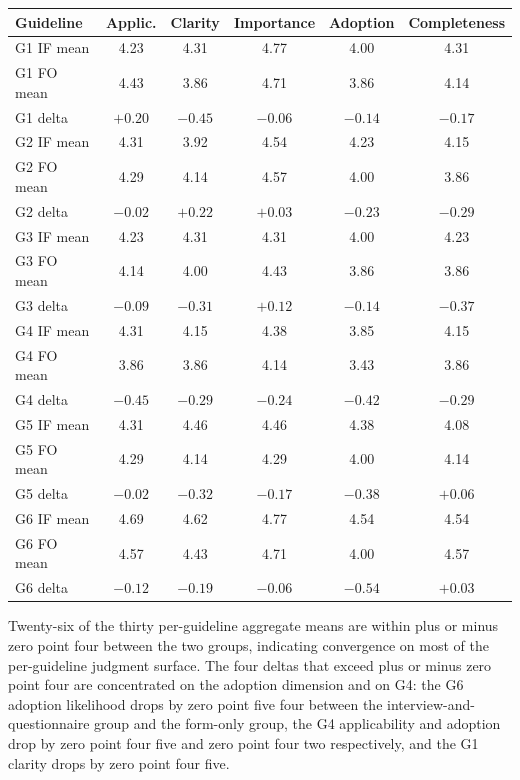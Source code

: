 \begin{longtable}{p{2cm} c c c c c}
\toprule
\textbf{Guideline} & \textbf{Applic.} & \textbf{Clarity} & \textbf{Importance} & \textbf{Adoption} & \textbf{Completeness} \\
\midrule
\endhead
G1 IF mean & 4.23 & 4.31 & 4.77 & 4.00 & 4.31 \\
G1 FO mean & 4.43 & 3.86 & 4.71 & 3.86 & 4.14 \\
G1 delta & $+0.20$ & $-0.45$ & $-0.06$ & $-0.14$ & $-0.17$ \\
\midrule
G2 IF mean & 4.31 & 3.92 & 4.54 & 4.23 & 4.15 \\
G2 FO mean & 4.29 & 4.14 & 4.57 & 4.00 & 3.86 \\
G2 delta & $-0.02$ & $+0.22$ & $+0.03$ & $-0.23$ & $-0.29$ \\
\midrule
G3 IF mean & 4.23 & 4.31 & 4.31 & 4.00 & 4.23 \\
G3 FO mean & 4.14 & 4.00 & 4.43 & 3.86 & 3.86 \\
G3 delta & $-0.09$ & $-0.31$ & $+0.12$ & $-0.14$ & $-0.37$ \\
\midrule
G4 IF mean & 4.31 & 4.15 & 4.38 & 3.85 & 4.15 \\
G4 FO mean & 3.86 & 3.86 & 4.14 & 3.43 & 3.86 \\
G4 delta & $-0.45$ & $-0.29$ & $-0.24$ & $-0.42$ & $-0.29$ \\
\midrule
G5 IF mean & 4.31 & 4.46 & 4.46 & 4.38 & 4.08 \\
G5 FO mean & 4.29 & 4.14 & 4.29 & 4.00 & 4.14 \\
G5 delta & $-0.02$ & $-0.32$ & $-0.17$ & $-0.38$ & $+0.06$ \\
\midrule
G6 IF mean & 4.69 & 4.62 & 4.77 & 4.54 & 4.54 \\
G6 FO mean & 4.57 & 4.43 & 4.71 & 4.00 & 4.57 \\
G6 delta & $-0.12$ & $-0.19$ & $-0.06$ & $-0.54$ & $+0.03$ \\
\bottomrule
\end{longtable}

\noindent
Twenty-six of the thirty per-guideline aggregate means are within plus or minus zero point four between the two groups, indicating convergence on most of the per-guideline judgment surface. The four deltas that exceed plus or minus zero point four are concentrated on the adoption dimension and on G4: the G6 adoption likelihood drops by zero point five four between the interview-and-questionnaire group and the form-only group, the G4 applicability and adoption drop by zero point four five and zero point four two respectively, and the G1 clarity drops by zero point four five.

